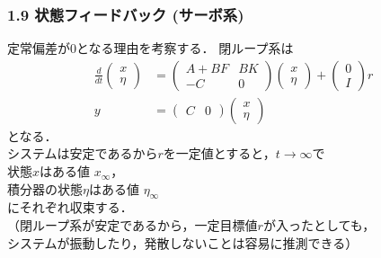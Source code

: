 \documentclass[10pt]{beamer}
\begin{document}
\begin{frame}[t]
\frametitle{1.9 状態フィードバック (サーボ系)}
定常偏差が$0$となる理由を考察する．
閉ループ系は
\begin{align}
 \frac{d}{dt}
  \left(\begin{array}{c}
         x \\
   \eta
  \end{array}\right)
  &=
  \left(\begin{array}{cc}
         A + B F & B K \\
   - C     & 0
  \end{array}\right)
  \left(\begin{array}{c}
         x \\
   \eta
  \end{array}\right)
  +
  \left(\begin{array}{c}
         0 \\
   I
  \end{array}\right)
  r \\
 y &=
  \left(\begin{array}{cc}
         C & 0
  \end{array}\right)
  \left(\begin{array}{c}
         x \\
   \eta
  \end{array}\right)
\end{align}
となる．\\
システムは安定であるから$r$を一定値とすると，$t \rightarrow \infty$で\\
  状態$x$はある値 $x_{\infty}$，\\
  積分器の状態$\eta$はある値 $\eta_{\infty}$\\
にそれぞれ収束する．\\
（閉ループ系が安定であるから，一定目標値$r$が入ったとしても，\\
システムが振動したり，発散しないことは容易に推測できる）
\end{frame}
\end{document}
